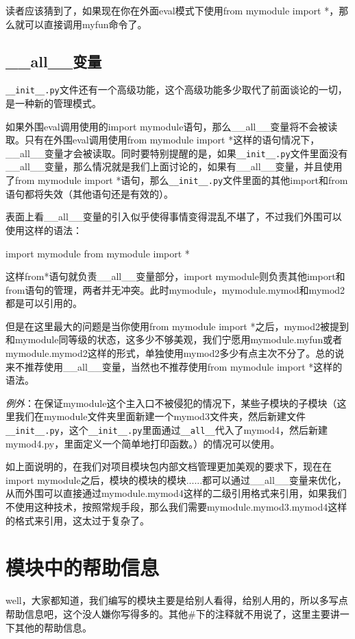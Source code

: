 \documentclass[12pt,oneside]{book}
\begin{document}
\begin{common-format}
读者应该猜到了，如果现在你在外面eval模式下使用from mymodule import *，那么就可以直接调用myfun命令了。


\subsection{\_{}\_{}all\_{}\_{}变量}
\verb+__init__.py+文件还有一个高级功能，这个高级功能多少取代了前面谈论的一切，是一种新的管理模式。

如果外围eval调用使用的import mymodule语句，那么\_{}\_{}all\_{}\_{}变量将不会被读取。只有在外围eval调用使用from mymodule import *这样的语句情况下，\_{}\_{}all\_{}\_{}变量才会被读取。同时要特别提醒的是，如果\verb+__init__.py+文件里面没有\_{}\_{}all\_{}\_{}变量，那么情况就是我们上面讨论的，如果有\_{}\_{}all\_{}\_{}变量，并且使用了from mymodule import *语句，那么\verb+__init__.py+文件里面的其他import和from语句都将失效（其他语句还是有效的）。

表面上看\_{}\_{}all\_{}\_{}变量的引入似乎使得事情变得混乱不堪了，不过我们外围可以使用这样的语法：
\begin{tcbpython}[]
import mymodule
from mymodule import *
\end{tcbpython}
这样from*语句就负责\_{}\_{}all\_{}\_{}变量部分，import mymodule则负责其他import和from语句的管理，两者并无冲突。此时mymodule，mymodule.mymod和mymod2都是可以引用的。

但是在这里最大的问题是当你使用from mymodule import *之后，mymod2被提到和mymodule同等级的状态，这多少不够美观，我们宁愿用mymodule.myfun或者mymodule.mymod2这样的形式，单独使用mymod2多少有点主次不分了。总的说来不推荐使用\_{}\_{}all\_{}\_{}变量，当然也不推荐使用from mymodule import *这样的语法。

\emph{例外}：在保证mymodule这个主入口不被侵犯的情况下，某些子模块的子模块（这里我们在mymodule文件夹里面新建一个mymod3文件夹，然后新建文件\verb+__init__.py+，这个\verb+__init__.py+里面通过\verb+__all__+代入了mymod4，然后新建mymod4.py，里面定义一个简单地打印函数。）的情况可以使用。

如上面说明的，在我们对项目模块包内部文档管理更加美观的要求下，现在在import mymodule之后，模块的模块的模块......都可以通过\_{}\_{}all\_{}\_{}变量来优化，从而外围可以直接通过mymodule.mymod4这样的二级引用格式来引用，如果我们不使用这种技术，按照常规手段，那么我们需要mymodule.mymod3.mymod4这样的格式来引用，这太过于复杂了。


\section{模块中的帮助信息}
well，大家都知道，我们编写的模块主要是给别人看得，给别人用的，所以多写点帮助信息吧，这个没人嫌你写得多的。其他\#{}下的注释就不用说了，这里主要讲一下其他的帮助信息。


\end{common-format}
\end{document}
